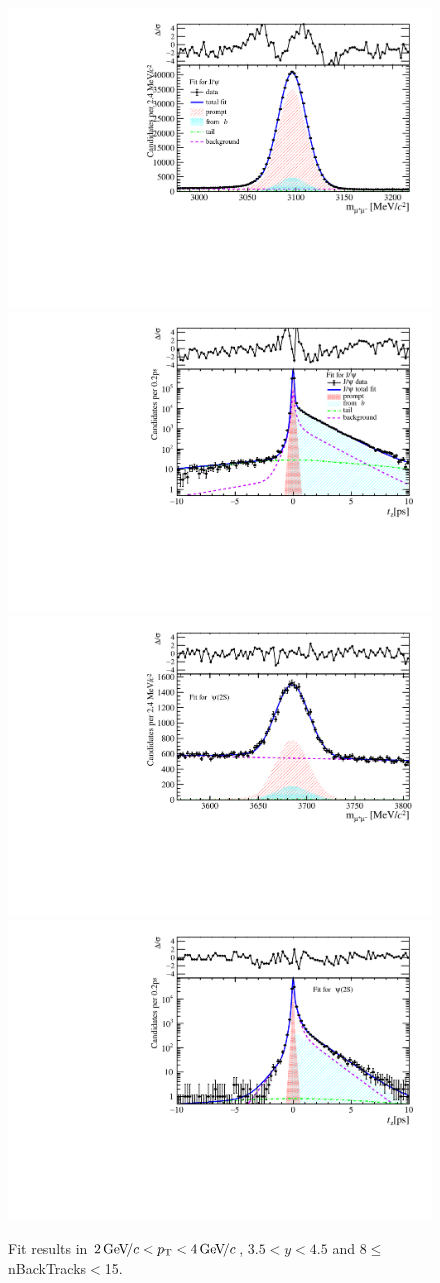 \begin{figure}[H]
\begin{center}
\includegraphics[width=0.47\linewidth]{pdf/Jpsi/drawmassB/n2y3pt2.pdf}
\includegraphics[width=0.47\linewidth]{pdf/Jpsi/2DFitB/n2y3pt2.pdf}
\vspace*{-0.5cm}
\includegraphics[width=0.47\linewidth]{pdf/Psi2S/drawmassB/n2y3pt2.pdf}
\includegraphics[width=0.47\linewidth]{pdf/Psi2S/2DFitB/n2y3pt2.pdf}
\vspace*{-0.5cm}
\end{center}
\caption{Fit results in $2\text{\,Ge\kern -0.1em V\!/}c<p_{\mathrm{T}}<4\text{\,Ge\kern -0.1em V\!/}c$, $3.5<y<4.5$ and 8$\leq$nBackTracks$<$15.}
\label{Fitn2y3pt2}
\end{figure}
